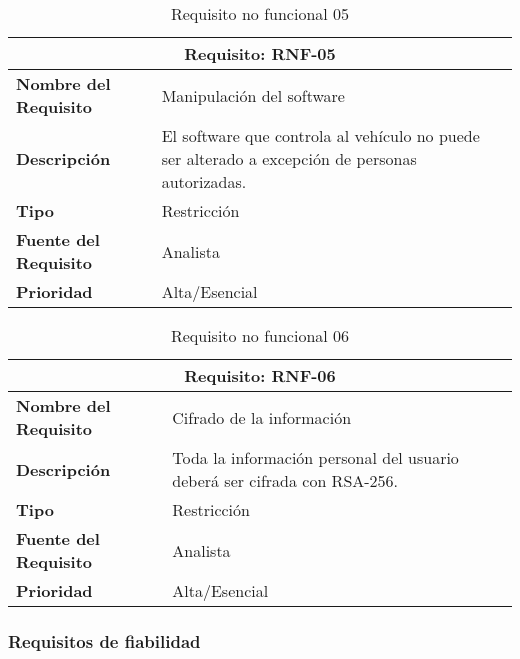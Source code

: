 \begin{table}[H]
\begin{center}
\begin{tabular}{p{} p{7cm}}
\multicolumn{2}{c}{\textbf{Requisito: RNF-05} } \\
\hline \hline
\textbf{Nombre del Requisito} & Manipulación del software\\
\hline
\textbf{Descripción} & El software que controla al vehículo no puede ser alterado a excepción de personas autorizadas.\\
\hline
\textbf{Tipo} & Restricción  \\
\hline
\textbf{Fuente del Requisito} & Analista  \\
\hline
\textbf{Prioridad} & Alta/Esencial \\ \hline
\end{tabular}
\caption{Requisito no funcional 05}
\label{tab:RNF-05}
\end{center}
\end{table}

\begin{table}[H]
\begin{center}
\begin{tabular}{p{} p{7cm}}
\multicolumn{2}{c}{\textbf{Requisito: RNF-06} } \\
\hline \hline
\textbf{Nombre del Requisito} & Cifrado de la información\\
\hline
\textbf{Descripción} & Toda la información personal del usuario deberá ser cifrada con RSA-256.\\
\hline
\textbf{Tipo} & Restricción  \\
\hline
\textbf{Fuente del Requisito} & Analista  \\
\hline
\textbf{Prioridad} & Alta/Esencial \\ \hline
\end{tabular}
\caption{Requisito no funcional 06}
\label{tab:RNF-06}
\end{center}
\end{table}

\subsubsection{Requisitos de fiabilidad}

